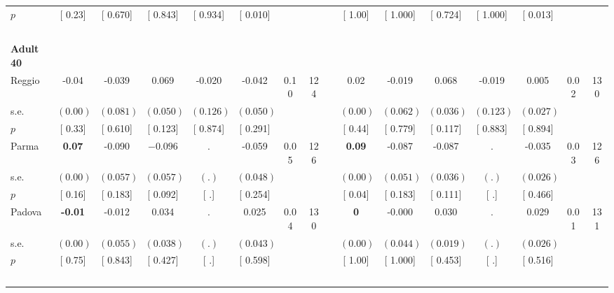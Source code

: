 \begin{longtable}{L{8em} c c c c c c c p{1em} c c c c c c c}
\quad \quad \quad \quad $ p$ & [     0.23] & [    0.670] & [    0.843] & [    0.934] & [    0.010] & & & & [     1.00] & [    1.000] & [    0.724] & [    1.000] & [    0.013] & &  \\[1em]
~\\[1em]
\quad \quad \textbf{Adult 40} & & & & & & & & & & & & & & & \\* 
\quad \quad \quad Reggio& -0.04 &    -0.039 &     0.069 &    -0.020 &    -0.042 &      0.10 &       124 & & 0.02 &    -0.019 &     0.068 &    -0.019 &     0.005 &      0.02 &       130  \\*
\quad \quad \quad \quad s.e.& $ (     0.00)$ & $ (    0.081)$ & $ (    0.050)$ & $ (    0.126)$ & $ (    0.050)$ & & & & $ (     0.00)$ & $ (    0.062)$ & $ (    0.036)$ & $ (    0.123)$ & $ (    0.027)$ & &  \\*
\quad \quad \quad \quad $ p$ & [     0.33] & [    0.610] & [    0.123] & [    0.874] & [    0.291] & & & & [     0.44] & [    0.779] & [    0.117] & [    0.883] & [    0.894] & &  \\[1em]
\quad \quad \quad Parma& \textbf{     0.07} &    -0.090 & $ \mathbf{   -0.096}$ &         . &    -0.059 &      0.05 &       126 & & \textbf{     0.09} &    -0.087 &    -0.087 &         . &    -0.035 &      0.03 &       126  \\*
\quad \quad \quad \quad s.e.& $ (     0.00)$ & $ (    0.057)$ & $ (    0.057)$ & $ (        .)$ & $ (    0.048)$ & & & & $ (     0.00)$ & $ (    0.051)$ & $ (    0.036)$ & $ (        .)$ & $ (    0.026)$ & &  \\*
\quad \quad \quad \quad $ p$ & [     0.16] & [    0.183] & [    0.092] & [        .] & [    0.254] & & & & [     0.04] & [    0.183] & [    0.111] & [        .] & [    0.466] & &  \\[1em]
\quad \quad \quad Padova& \textbf{    -0.01} &    -0.012 &     0.034 &         . &     0.025 &      0.04 &       130 & & \textbf{0} &    -0.000 &     0.030 &         . &     0.029 &      0.01 &       131  \\*
\quad \quad \quad \quad s.e.& $ (     0.00)$ & $ (    0.055)$ & $ (    0.038)$ & $ (        .)$ & $ (    0.043)$ & & & & $ (     0.00)$ & $ (    0.044)$ & $ (    0.019)$ & $ (        .)$ & $ (    0.026)$ & &  \\*
\quad \quad \quad \quad $ p$ & [     0.75] & [    0.843] & [    0.427] & [        .] & [    0.598] & & & & [     1.00] & [    1.000] & [    0.453] & [        .] & [    0.516] & &  \\[1em]
~\\[1em]

\end{longtable}
